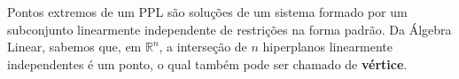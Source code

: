
Pontos extremos de um PPL são soluções de um sistema formado por um subconjunto linearmente independente de restrições na forma padrão. Da Álgebra Linear, sabemos que, em $\mathbb{R}^n$, a interseção de $n$ hiperplanos linearmente independentes é um ponto, o qual também pode ser chamado de \textbf{vértice}.

